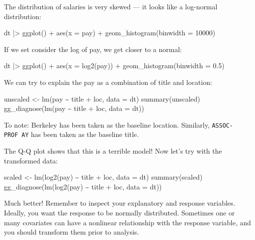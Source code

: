 \documentclass[
  letterpaper,
  DIV=11,
  numbers=noendperiod]{scrreprt}
\newenvironment{Shaded}{\begin{snugshade}}{\end{snugshade}}
\newcommand{\NormalTok}[1]{\textcolor[rgb]{0.00,0.23,0.31}{#1}}
\begin{document}
The distribution of salaries is very skewed --- it looks like a
log-normal distribution:

\begin{Shaded}
\begin{Highlighting}[]
\NormalTok{dt |\textgreater{} ggplot() + aes(x = pay) + geom\_histogram(binwidth = 10000)}
\end{Highlighting}
\end{Shaded}

If we set consider the log of pay, we get closer to a normal:

\begin{Shaded}
\begin{Highlighting}[]
\NormalTok{dt |\textgreater{} ggplot() + aes(x = log2(pay)) + geom\_histogram(binwidth = 0.5)}
\end{Highlighting}
\end{Shaded}

We can try to explain the pay as a combination of title and location:

\begin{Shaded}
\begin{Highlighting}[]
\NormalTok{unscaled \textless{}{-} lm(pay \textasciitilde{} title + loc, data = dt)}
\NormalTok{summary(unscaled)}
\NormalTok{gg\_diagnose(lm(pay \textasciitilde{} title + loc, data = dt))}
\end{Highlighting}
\end{Shaded}

To note: Berkeley has been taken as the baseline location. Similarly,
\texttt{ASSOC-PROF\ AY} has been taken as the baseline title.

The Q-Q plot shows that this is a terrible model! Now let's try with the
transformed data:

\begin{Shaded}
\begin{Highlighting}[]
\NormalTok{scaled \textless{}{-} lm(log2(pay) \textasciitilde{} title + loc, data = dt)}
\NormalTok{summary(scaled)}
\NormalTok{gg\_diagnose(lm(log2(pay) \textasciitilde{} title + loc, data = dt))}
\end{Highlighting}
\end{Shaded}

Much better! Remember to inspect your explanatory and response
variables. Ideally, you want the response to be normally distributed.
Sometimes one or many covariates can have a nonlinear relationship with
the response variable, and you should transform them prior to analysis.
\end{document}
